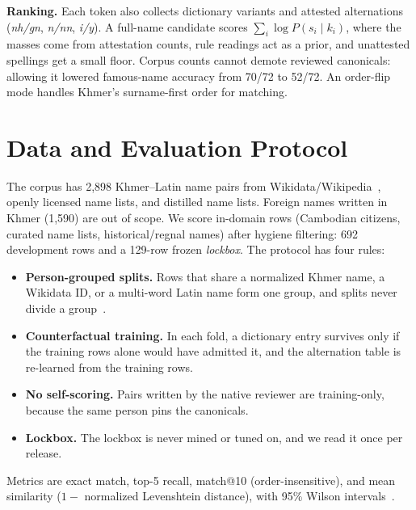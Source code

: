 \documentclass[10pt,twocolumn,a4paper]{article}
\begin{document}
\textbf{Ranking.} Each token also collects dictionary variants and
attested alternations (\emph{nh/gn}, \emph{n/nn}, \emph{i/y}). A
full-name candidate scores $\sum_i \log P(s_i \mid k_i)$, where the
masses come from attestation counts, rule readings act as a
prior, and unattested spellings get a small floor. Corpus counts cannot
demote reviewed canonicals: allowing it lowered famous-name accuracy
from 70/72 to 52/72. An order-flip mode handles Khmer's surname-first
order for matching.

\section{Data and Evaluation Protocol}
The corpus has 2,898 Khmer--Latin name pairs from
Wikidata/Wikipedia~\cite{vrandecic2014wikidata}, openly licensed name
lists, and distilled name lists. Foreign names written in Khmer (1,590)
are out of scope. We score in-domain rows (Cambodian citizens, curated
name lists, historical/regnal names) after hygiene filtering: 692
development rows and a 129-row frozen \emph{lockbox}. The protocol has
four rules:
\begin{itemize}
\item \textbf{Person-grouped splits.} Rows that share a normalized Khmer
name, a Wikidata ID, or a multi-word Latin name form one group, and
splits never divide a group~\cite{gorman2019standard}.
\item \textbf{Counterfactual training.} In each fold, a dictionary entry
survives only if the training rows alone would have admitted it, and the
alternation table is re-learned from the training rows.
\item \textbf{No self-scoring.} Pairs written by the native reviewer are
training-only, because the same person pins the canonicals.
\item \textbf{Lockbox.} The lockbox is never mined or tuned on, and we
read it once per release.
\end{itemize}
Metrics are exact match, top-5 recall, match@10 (order-insensitive), and
mean similarity ($1 -$ normalized Levenshtein distance), with 95\% Wilson
intervals~\cite{wilson1927probable}.
\end{document}

